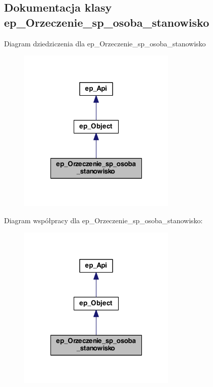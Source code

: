 \hypertarget{classep___orzeczenie__sp__osoba__stanowisko}{\subsection{Dokumentacja klasy ep\-\_\-\-Orzeczenie\-\_\-sp\-\_\-osoba\-\_\-stanowisko}
\label{classep___orzeczenie__sp__osoba__stanowisko}
}


Diagram dziedziczenia dla ep\-\_\-\-Orzeczenie\-\_\-sp\-\_\-osoba\-\_\-stanowisko\nopagebreak
\begin{figure}[H]
\begin{center}
\leavevmode
\includegraphics[width=214pt]{classep___orzeczenie__sp__osoba__stanowisko__inherit__graph}
\end{center}
\end{figure}


Diagram współpracy dla ep\-\_\-\-Orzeczenie\-\_\-sp\-\_\-osoba\-\_\-stanowisko\-:\nopagebreak
\begin{figure}[H]
\begin{center}
\leavevmode
\includegraphics[width=214pt]{classep___orzeczenie__sp__osoba__stanowisko__coll__graph}
\end{center}
\end{figure}
